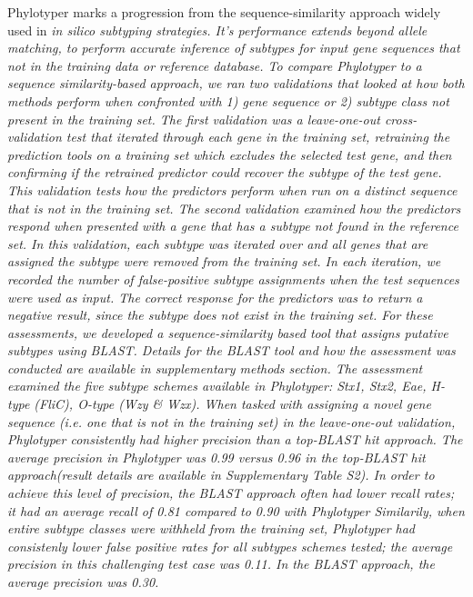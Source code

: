 \documentclass{bioinfo}
\begin{document}
Phylotyper marks a progression from the sequence-similarity approach widely used in \it{in silico} subtyping strategies.
It's performance extends beyond allele matching, to perform accurate inference of subtypes for input gene sequences that not in the training data or reference database.
To compare Phylotyper to a sequence similarity-based approach, we ran two validations that looked at how both methods perform when confronted with 1) gene sequence or 2) subtype class not present in the training set.
The first validation was a leave-one-out cross-validation test that iterated through each gene in the training set, retraining the prediction tools on a training set which excludes the selected test gene, and then confirming if the retrained predictor could recover the subtype of the test gene.
This validation tests how the predictors perform when run on a distinct sequence that is not in the training set.
The second validation examined how the predictors respond when presented with a gene that has a subtype not found in the reference set.
In this validation, each subtype was iterated over and all genes that are assigned the subtype were removed from the training set.
In each iteration, we recorded the number of false-positive subtype assignments when the test sequences were used as input.
The correct response for the predictors was to return a negative result, since the subtype does not exist in the training set.
For these assessments, we developed a sequence-similarity based tool that assigns putative subtypes using BLAST.
Details for the BLAST tool and how the assessment was conducted are available in supplementary methods section.
The assessment examined the five subtype schemes available in Phylotyper: Stx1, Stx2, Eae, H-type (FliC), O-type (Wzy \& Wzx).
When tasked with assigning a novel gene sequence (i.e. one that is not in the training set) in the leave-one-out validation, Phylotyper consistently had higher precision than a top-BLAST hit approach.
The average precision in Phylotyper was 0.99 versus 0.96 in the top-BLAST hit approach(result details are available in Supplementary Table S2).
In order to achieve this level of precision, the BLAST approach often had lower recall rates; it had an average recall of 0.81 compared to 0.90 with Phylotyper
Similarily, when entire subtype classes were withheld from the training set, Phylotyper had consistenly lower false positive rates for all subtypes schemes tested; the average precision in this challenging test case was 0.11.
In the BLAST approach, the average precision was 0.30.
\end{document}
